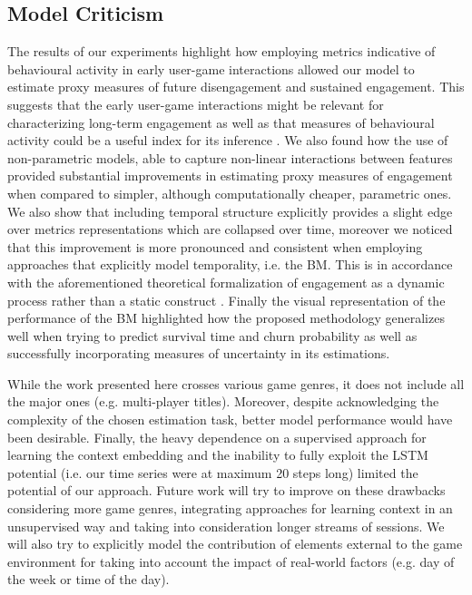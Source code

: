 \subsection{Model Criticism}
The results of our experiments highlight how employing metrics indicative of behavioural activity in early user-game interactions allowed our model to estimate proxy measures of future disengagement and sustained engagement. This suggests that the early user-game interactions might be relevant for characterizing long-term engagement as well as that measures of behavioural activity could be a useful index for its inference \cite{milovsevic2017early, mirza2013does}. We also found how the use of non-parametric models, able to capture non-linear interactions between features provided substantial improvements in estimating proxy measures of engagement when compared to simpler, although computationally cheaper, parametric ones. We also show that including temporal structure explicitly provides a slight edge over metrics representations which are collapsed over time, moreover we noticed that this improvement is more pronounced and consistent when employing approaches that explicitly model temporality, i.e. the BM. This is in accordance with the aforementioned theoretical formalization of engagement as a dynamic process rather than a static construct \cite{o2008user}. Finally the visual representation of the performance of the BM highlighted how the proposed methodology generalizes well when trying to predict survival time and churn probability as well as successfully incorporating measures of uncertainty in its estimations. 

While the work presented here crosses various game genres, it does not include all the major ones (e.g. multi-player titles). Moreover, despite acknowledging the complexity of the chosen estimation task, better model performance would have been desirable. Finally, the heavy dependence on a supervised approach for learning the context embedding and the inability to fully exploit the LSTM potential (i.e. our time series were at maximum 20 steps long) limited the potential of our approach. Future work will try to improve on these drawbacks considering more game genres, integrating approaches for learning context in an unsupervised way and taking into consideration longer streams of sessions. We will also try to explicitly model the contribution of elements external to the game environment for taking into account the impact of real-world factors (e.g. day of the week or time of the day).

